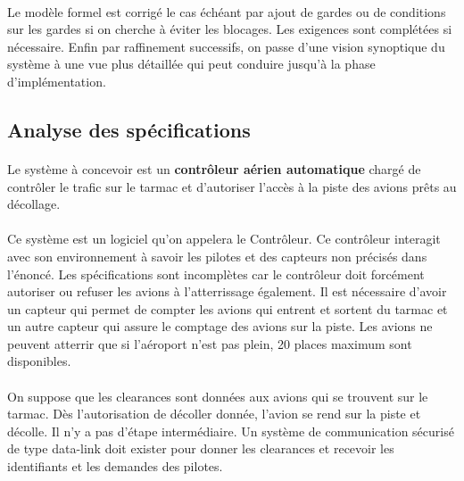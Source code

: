 \paragraph{} Le modèle formel est corrigé le cas échéant par ajout de gardes ou de conditions sur les gardes si on cherche à éviter les blocages. Les exigences sont complétées si nécessaire. Enfin par raffinement successifs, on passe d'une vision synoptique du système à une vue plus détaillée qui peut conduire jusqu'à la phase d'implémentation.







\subsection{Analyse des spécifications}

\paragraph{}

Le système à concevoir est un \textbf{contrôleur aérien automatique} chargé de contrôler le trafic sur le tarmac et d'autoriser l'accès à la piste des avions prêts au décollage. 
\paragraph{}
Ce système est un logiciel qu'on appelera le Contrôleur. Ce contrôleur interagit avec son environnement à savoir les pilotes et des capteurs non précisés dans l'énoncé. Les spécifications sont incomplètes car le contrôleur doit forcément autoriser ou refuser les avions à l'atterrissage également. Il est nécessaire d'avoir un capteur qui permet de compter les avions qui entrent et sortent du tarmac et un autre capteur qui assure le comptage des avions sur la piste. Les avions ne peuvent atterrir que si l'aéroport n'est pas plein, 20 places maximum sont disponibles. 
\paragraph{}
On suppose que les clearances sont données aux avions qui se trouvent sur le tarmac. Dès l'autorisation de décoller donnée, l'avion se rend sur la piste et décolle. Il n'y a pas d'étape intermédiaire. Un système de communication sécurisé de type data-link doit exister pour donner les clearances et recevoir les identifiants et les demandes des pilotes.

